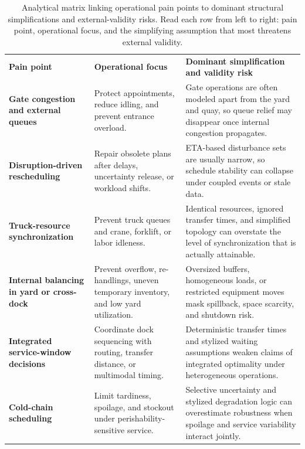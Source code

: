 \documentclass[preprint,12pt,number,longtitle]{elsarticle}
\begin{document}
\begin{table}[t]
\caption{Analytical matrix linking operational pain points to dominant structural simplifications and external-validity risks. Read each row from left to right: pain point, operational focus, and the simplifying assumption that most threatens external validity.}
\label{tab:matrix}
\footnotesize
\setlength{\tabcolsep}{4pt}
\renewcommand{\arraystretch}{1.15}
\begin{tabularx}{\textwidth}{>{\raggedright\arraybackslash\bfseries}p{} >{\raggedright\arraybackslash}p{} >{\raggedright\arraybackslash}X}
\rowcolor{tablehead}
\textbf{Pain point} & \textbf{Operational focus} & \textbf{Dominant simplification and validity risk} \\
Gate congestion and external queues & Protect appointments, reduce idling, and prevent entrance overload. & Gate operations are often modeled apart from the yard and quay, so queue relief may disappear once internal congestion propagates. \\
Disruption-driven rescheduling & Repair obsolete plans after delays, uncertainty release, or workload shifts. & ETA-based disturbance sets are usually narrow, so schedule stability can collapse under coupled events or stale data. \\
Truck-resource synchronization & Prevent truck queues and crane, forklift, or labor idleness. & Identical resources, ignored transfer times, and simplified topology can overstate the level of synchronization that is actually attainable. \\
Internal balancing in yard or cross-dock & Prevent overflow, re-handlings, uneven temporary inventory, and low yard utilization. & Oversized buffers, homogeneous loads, or restricted equipment moves mask spillback, space scarcity, and shutdown risk. \\
Integrated service-window decisions & Coordinate dock sequencing with routing, transfer distance, or multimodal timing. & Deterministic transfer times and stylized waiting assumptions weaken claims of integrated optimality under heterogeneous operations. \\
Cold-chain scheduling & Limit tardiness, spoilage, and stockout under perishability-sensitive service. & Selective uncertainty and stylized degradation logic can overestimate robustness when spoilage and service variability interact jointly. \\
\end{tabularx}
\end{table}
\end{document}
